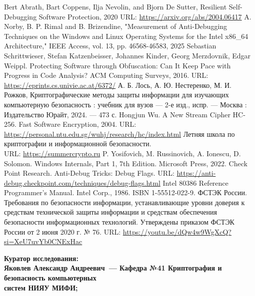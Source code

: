 \documentclass[a4paper,12pt]{article}
\theoremstyle{definition}
\begin{document}
\renewcommand\refname{\center \textnormal{\normalsize{ЛИТЕРАТУРА}}}
\begin{thebibliography}{}
 Bert Abrath, Bart Coppens, Ilja Nevolin, and Bjorn De Sutter, Resilient Self-Debugging Software Protection, 2020 URL: \url{https://arxiv.org/abs/2004.06417}
 A. Norby, B. P. Rimal and B. Brizendine, "Measurement of Anti-Debugging Techniques on the Windows and Linux Operating Systems for the Intel x86\_64 Architecture," IEEE Access, vol. 13, pp. 46568-46583, 2025
 Sebastian Schrittwieser, Stefan Katzenbeisser, Johannes Kinder, Georg Merzdovnik, Edgar Weippl. Protecting Software through Obfuscation: Can It Keep Pace with Progress in Code Analysis? ACM Computing Surveys, 2016. URL: \url{https://eprints.cs.univie.ac.at/6372/}
А. Б. Лось, А. Ю. Нестеренко, М. И. Рожков, Криптографические методы защиты информации для изучающих компьютерную безопасность : учебник для вузов — 2-е изд., испр. — Москва : Издательство Юрайт, 2024. — 473 с.
 Hongjun Wu. A New Stream Cipher HC-256. Fast Software Encryption, 2004. URL: \url{https://personal.ntu.edu.sg/wuhj/research/hc/index.html}
 Летняя школа по криптографии и информационной безопасности.
\\ URL: \url{https://summercrypto.ru}
P. Yosifovich, M. Russinovich, A. Ionescu, D. Solomon.
Windows Internals, Part 1, 7th Edition.
Microsoft Press, 2022.
 Check Point Research. Anti-Debug Tricks: Debug Flags. URL: \url{https://anti-debug.checkpoint.com/techniques/debug-flags.html}
Intel 80386 Reference Programmer's Manual. Intel Corp., 1986. ISBN 1-55512-022-9.
ФСТЭК России. Требования по безопасности информации, устанавливающие уровни доверия к средствам технической защиты информации и средствам обеспечения безопасности информационных технологий. Утверждены приказом ФСТЭК России от 2 июня 2020 г. № 76. URL: \url{https://youtu.be/dQw4w9WgXcQ?si=XeU7uvYb0CNExHac}
\end{thebibliography}

\bf{Куратор исследования:} \rm{\\
 Яковлев Александр Андреевич~--- Кафедра №41 Криптография и безопасность компьютерных \\ систем НИЯУ МИФИ; \\
 }
 
\end{document}
